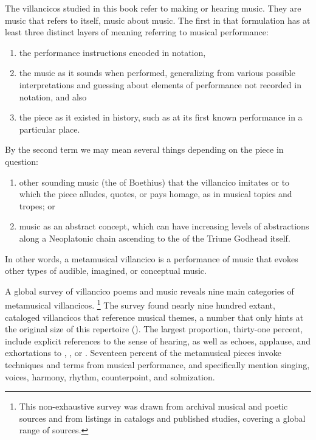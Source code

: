 The villancicos studied in this book refer to making or hearing music.
They are music that refers to itself, music about music.
The first  in that formulation has at least three distinct layers of meaning referring to musical performance: 
\begin{enumerate}
\item the performance instructions encoded in notation, 
\item the music as it sounds when performed, generalizing from various possible interpretations and guessing about elements of performance not recorded in notation, and also 
\item the piece as it existed in history, such as at its first known performance in a particular place.
\end{enumerate}
By the second term  we may mean several things depending on the piece in question: 
\begin{enumerate}
\item other sounding music (the  of Boethius) that the villancico imitates or to which the piece alludes, quotes, or pays homage, as in musical topics and tropes; or 
\item music as an abstract concept, which can have increasing levels of abstractions along a Neoplatonic chain ascending to the  of the Triune Godhead itself.
\end{enumerate}
In other words, a metamusical villancico is a performance of music that evokes other types of audible, imagined, or conceptual music.

A global survey of villancico poems and music reveals nine main categories of metamusical villancicos.%
  \footnote{This non-exhaustive survey was drawn from archival musical and poetic sources and from listings in catalogs and published studies, covering a global range of sources.}
The survey found nearly nine hundred extant, cataloged villancicos that reference musical themes, a number that only hints at the original size of this repertoire ().
The largest proportion, thirty-one percent, include explicit references to the sense of hearing, as well as echoes, applause, and exhortations to , , or .
Seventeen percent of the metamusical pieces invoke techniques and terms from musical performance, and specifically mention singing, voices, harmony, rhythm, counterpoint, and solmization.

